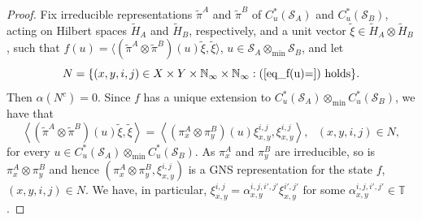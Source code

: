 \documentclass[11pt]{amsart}
\theoremstyle{definition}
\newcommand{\cl}[1]{\mathcal{#1}}
\begin{document}
\begin{proof}
  Fix irreducible representations 
  $\tilde \pi^A$ and $\tilde \pi^B$ of 
  $C^*_u(\cl S_A)$ and $C^*_u(\cl S_B)$, acting on Hilbert spaces
$\tilde H_A$ and $\tilde H_B$, respectively, 
and a unit vector $\tilde \xi\in\tilde H_A\otimes\tilde H_B$, 
such that 
$f(u) = \langle (\tilde\pi^A\otimes\tilde \pi^B)(u)\tilde\xi,\tilde \xi\rangle$, $u\in \cl S_A\otimes_{\min}\cl S_B$,   
and  let 
$$N = \{(x,y,i,j)\in X\times Y\times \mathbb N_\infty\times \mathbb N_\infty 
 : (\ref{eq_f(u)=}) \mbox{ holds}\}.$$ 
Then $\alpha(N^c)=0$.
  Since $f$ has a unique extension to 
  $C^*_u(\cl S_A)\otimes_{\min} C^*_u(\cl S_B)$, 
  we have that 
  $$\left\langle (\tilde \pi^A\otimes\tilde \pi^B)(u)\tilde \xi,\tilde\xi\right\rangle 
  = \left\langle (\pi_{x}^A\otimes\pi_{y}^B)(u)\xi_{x,y}^{i,j},\xi_{x,y}^{i,j}\right\rangle,  
  \ \ \ (x,y,i,j)\in N,$$ 
  for every $u \in C^*_u(\cl S_A)\otimes_{\min} C^*_u(\cl S_B)$. 
  As $\pi_x^A$ and $\pi_y^B$ are irreducible, so is $\pi_x^A\otimes\pi_y^B$ and hence $(\pi_x^A\otimes\pi_y^B, \xi_{x,y}^{i,j})$ is a GNS representation for the state $f$, 
  $(x,y,i,j)\in N$. We have, in particular,  
  $\xi_{x,y}^{i,j}=\alpha_{x,y}^{i,j,i',j'}\xi_{x,y}^{i',j'}$ for some $\alpha_{x,y}^{i,j,i',j'}\in\mathbb T$. 
  

\end{proof}
\end{document}
